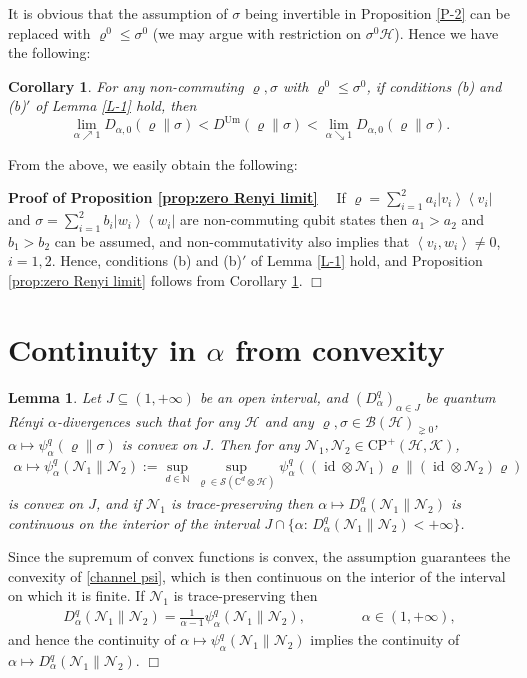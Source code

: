 \documentclass[unsortedaddress,superscriptaddress,pra,notitlepage]{revtex4}
\newtheorem{lemma}[definition]{Lemma}
\newtheorem{cor}[definition]{Corollary}
\newenvironment{proof}[1][Proof]{\begin{trivlist}
\item[\hskip \labelsep {\bfseries #1}]}{\hfill$\Box$\end{trivlist}}
\def\B{{\mathcal B}}
\def\N{\mathcal{N}}
\def\S{{\mathcal S}}
\def\bN{\mathbb{N}}
\def\bC{\mathbb{C}}
\def\rho{\varrho}
\def\hil{{\mathcal H}}
\def\kil{{\mathcal K}}
\def\bz{\left(}
\def\jz{\right)}
\def\CP{\mathrm{CP}}
\def\pne{_{\gneq 0}}
\def\cH{\mathcal{H}}
\def\Um{\mathrm{Um}}
\newcommand{\ds}{\mbox{ }\mbox{ }}
\newcommand{\inner}[2]{\left\langle #1 , #2\right\rangle}
\newcommand{\diad}[2]{\left|#1\right\rangle\!\left\langle #2\right|}
\newcommand{\pr}[1]{\diad{#1}{#1}}
\DeclareMathOperator{\id}{id}
\begin{document}
It is obvious that the assumption of $\sigma$ being invertible in Proposition \ref{P-2} can
be replaced with $\rho^0\le\sigma^0$ (we may argue with restriction on $\sigma^0\cH$).
Hence we have the following:

\begin{cor}\label{cor:zero Renyi limit}
For any non-commuting $\rho,\sigma$ with $\rho^0\le\sigma^0$, if conditions (b) and (b)$'$
of Lemma \ref{L-1} hold, then
\[
\lim_{\alpha\nearrow1}D_{\alpha,0}(\rho\|\sigma)
<D^\Um(\rho\|\sigma)<\lim_{\alpha\searrow1}D_{\alpha,0}(\rho\|\sigma).
\]
\end{cor}
\medskip

From the above, we easily obtain the following:
\medskip

\noindent \textbf{Proof of Proposition \ref{prop:zero Renyi limit}}\ds
If $\rho=\sum_{i=1}^2a_i\pr{v_i}$ and $\sigma=\sum_{i=1}^2 b_i\pr{w_i}$ are non-commuting 
qubit states then $a_1>a_2$ and $b_1>b_2$ can be assumed, and non-commutativity also implies that $\inner{v_i}{w_i}\ne 0$, $i=1,2$. Hence, conditions (b) and (b)$'$
of Lemma \ref{L-1} hold, and Proposition \ref{prop:zero Renyi limit} follows from 
Corollary \ref{cor:zero Renyi limit}. \hfill$\Box$


\section{Continuity in $\alpha$ from convexity}
\label{sec:cont from conv}

\begin{lemma}\label{lemma:cont from conv}
Let $J\subseteq (1,+\infty)$ be an open interval, and 
$(D_{\alpha}^q)_{\alpha\in J}$ be quantum R\'enyi $\alpha$-divergences such that 
for any $\hil$ and any $\rho,\sigma\in\B(\hil)\pne$, 
$\alpha\mapsto\psi_{\alpha}^q(\rho\|\sigma)$ is convex on $J$.
Then for any $\N_1,\N_2\in\CP^+(\hil,\kil)$,
\begin{align}\label{channel psi}
\alpha\mapsto \psi_{\alpha}^q(\N_1\|\N_2)
:=
\sup_{d\in\bN}\sup_{\rho\in\S(\bC^d\otimes\hil)}
\psi_{\alpha}^q\bz(\id\otimes\N_1)\rho\|(\id\otimes\N_2)\rho\jz
\end{align}
is convex on $J$,
and if $\N_1$ is trace-preserving then
$\alpha\mapsto D_{\alpha}^q(\N_1\|\N_2)$ is
continuous on the interior of the interval
$J\cap\{\alpha:\,D_{\alpha}^q(\N_1\|\N_2)<+\infty\}$.
\end{lemma}
\begin{proof}
Since the supremum of convex functions is convex, the assumption guarantees 
the convexity of \eqref{channel psi}, which is then 
continuous on the interior of the interval on which it is finite. 
If $\N_1$ is trace-preserving then 
\begin{align*}
D_{\alpha}^q(\N_1\|\N_2)=\frac{1}{\alpha-1}\psi_{\alpha}^q(\N_1\|\N_2),
\ds\ds\ds\alpha\in (1,+\infty),
\end{align*}
and hence the continuity of $\alpha\mapsto \psi_{\alpha}^q(\N_1\|\N_2)$ implies
the continuity of $\alpha\mapsto D_{\alpha}^q(\N_1\|\N_2)$.
\end{proof}
\end{document}
